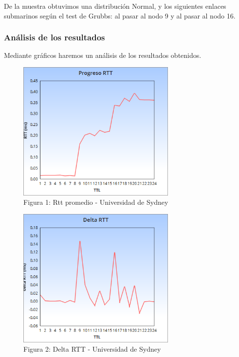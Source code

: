 De la muestra obtuvimos una distribuci\'on Normal, y los siguientes enlaces submarinos seg\'un el test de Grubbs: al pasar al nodo 9 y al pasar al nodo 16.\newline

\subsubsection{An\'alisis de los resultados}
Mediante gr\'aficos haremos un an\'alisis de los resultados obtenidos. \newline


\begin{figure}[h]
	\begin{center}
    \includegraphics[width=0.7\textwidth]{img_analisis2/RTTprom.png} 
	\caption{Figura 1: Rtt promedio - Universidad de Sydney}	
	\end{center} 
	
    
\end{figure}



\begin{figure}[h]
	\begin{center}
    \includegraphics[width=0.7\textwidth]{img_analisis2/Delta_RTT.png}
     \caption{Figura 2: Delta RTT - Universidad de Sydney} 
	\end{center} 
    
\end{figure}
\vspace{0.25cm}


